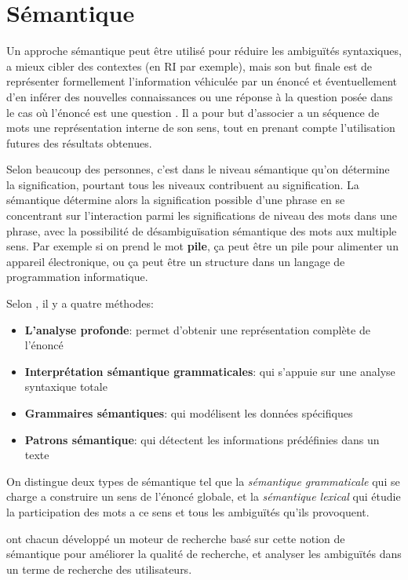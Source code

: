 \section{Sémantique}
Un approche sémantique peut être utilisé pour réduire les ambiguïtés syntaxiques, a mieux cibler des contextes (en RI par exemple), mais son but finale est de représenter formellement l’information véhiculée par un énoncé et éventuellement d’en inférer des nouvelles connaissances ou une réponse à la question posée dans le cas où l'énoncé est une question \citep{automatic-nlp}. Il a pour but d'associer a un séquence de mots une représentation interne de son sens, tout en prenant compte l'utilisation futures des résultats obtenues.

Selon beaucoup des personnes, c'est dans le niveau sémantique qu'on détermine la signification, pourtant tous les niveaux contribuent au signification. La sémantique détermine alors la signification possible d'une phrase en se concentrant sur l'interaction parmi les significations de niveau des mots dans une phrase, avec la possibilité de désambiguïsation sémantique des mots aux multiple sens. Par exemple si on prend le mot \textbf{pile}, ça peut être un pile pour alimenter un appareil électronique, ou ça peut être un structure dans un langage de programmation informatique.

Selon \citeauthor{automatic-nlp}, il y a quatre méthodes:
\begin{itemize}
    \item \textbf{L'analyse profonde}: permet d'obtenir une représentation complète de l’énoncé
    \item \textbf{Interprétation sémantique grammaticales}: qui s'appuie sur une analyse syntaxique totale
    \item \textbf{Grammaires sémantiques}: qui modélisent les données spécifiques
    \item \textbf{Patrons sémantique}: qui détectent les informations prédéfinies dans un texte
\end{itemize}

On distingue deux types de sémantique tel que la \textit{sémantique grammaticale} qui se charge a construire un sens de l'énoncé globale, et la \textit{sémantique lexical} qui étudie la participation des mots a ce sens et tous les ambiguïtés qu'ils provoquent.

\citeauthor{amelioration-ri-approche-semantique,approche-semantique} \citep{amelioration-ri-approche-semantique,approche-semantique} ont chacun développé un moteur de recherche basé sur cette notion de sémantique pour améliorer la qualité de recherche, et analyser les ambiguïtés dans un terme de recherche des utilisateurs.

